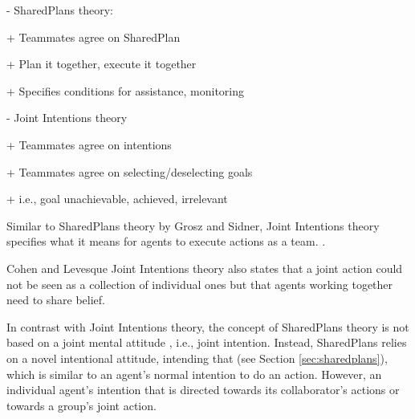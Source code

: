 \documentclass[11pt]{article}
\begin{document}
- SharedPlans theory:

+ Teammates agree on SharedPlan

+ Plan it together, execute it together

+ Specifies conditions for assistance, monitoring

- Joint Intentions theory

+ Teammates agree on intentions

+ Teammates agree on selecting/deselecting goals

+ i.e., goal unachievable, achieved, irrelevant

Similar to SharedPlans theory by Grosz and Sidner, Joint Intentions theory
specifies what it means for agents to execute actions as a team.
\cite{subramanian:joint-intention-dialogue}.

Cohen and Levesque Joint Intentions theory also states that a joint action could
not be seen as a collection of individual ones but that agents working together
need to share belief.

In contrast with Joint Intentions theory, the concept of SharedPlans theory is
not based on a joint mental attitude , i.e., joint intention. Instead,
SharedPlans relies on a novel intentional attitude, intending that (see
Section \ref{sec:sharedplans}), which is similar to an agent's normal intention
to do an action. However, an individual agent's intention that is directed
towards its collaborator's actions or towards a group's joint action.
\end{document}
